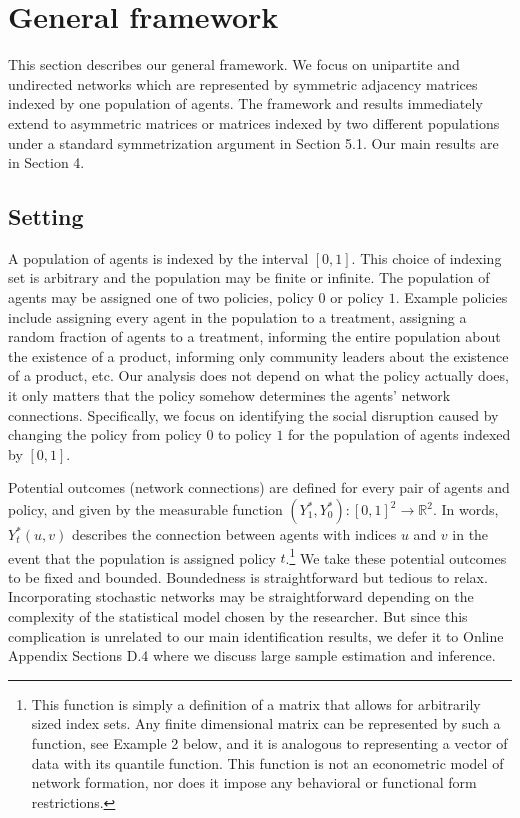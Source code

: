 \documentclass[12pt]{article}
\theoremstyle{definition}
\begin{document}
  
  
\section{General framework}
This section describes our general framework. We focus on unipartite and undirected networks which are represented by symmetric adjacency matrices indexed by one population of agents. The framework and results immediately extend to asymmetric matrices or matrices indexed by two different populations under a standard symmetrization argument in Section 5.1. Our main results are in Section 4.  


\subsection{Setting}
A population of agents is indexed by the interval $[0,1]$. This choice of indexing set is arbitrary and the population may be finite or infinite. The population of agents may be assigned one of two policies, policy $0$ or policy $1$. Example policies include assigning every agent in the population to a treatment, assigning a random fraction of agents to a treatment, informing the entire population about the existence of a product, informing only community leaders about the existence of a product, etc. Our analysis does not depend on what the policy actually does, it only matters that the policy somehow determines the agents' network connections. Specifically, we focus on identifying the social disruption caused by changing the policy from policy $0$ to policy $1$ for the population of agents indexed by $[0,1]$. 

Potential outcomes (network connections) are defined for every pair of agents and policy, and given by the measurable function $(Y^{*}_{1},Y^{*}_{0}):[0,1]^{2} \to \mathbb{R}^{2}$. In words, $Y_{t}^{*}(u,v)$ describes the connection between agents with indices $u$ and $v$ in the event that the population is assigned policy $t$.\footnote{This function is simply a definition of a matrix that allows for arbitrarily sized index sets. Any finite dimensional matrix can be represented by such a function, see Example 2 below, and it is analogous to representing a vector of data with its quantile function. This function is not an econometric model of network formation, nor does it impose any behavioral or functional form restrictions.} We take these potential outcomes to be fixed and bounded. Boundedness is straightforward but tedious to relax. Incorporating stochastic networks may be straightforward depending on the complexity of the statistical model chosen by the researcher. But since this complication is unrelated to our main identification results, we defer it to Online Appendix Sections D.4 where we discuss large sample estimation and inference.  
\end{document}
